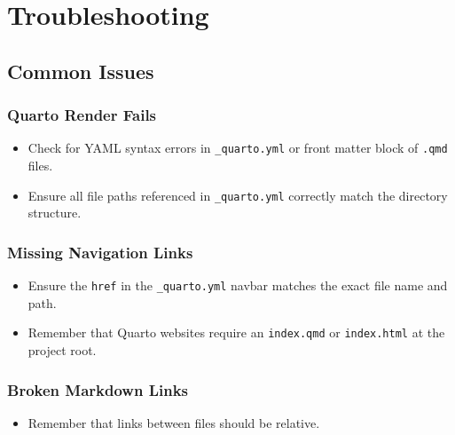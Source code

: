 \documentclass[
]{report}
\author{}
\date{}
\providecommand{\tightlist}{%
  \setlength{\itemsep}{0pt}\setlength{\parskip}{0pt}}
\renewcommand*\contentsname{Table of contents}
\newcommand\contentsname{Table of contents}
\begin{document}
\renewcommand*\contentsname{Table of contents}
{
\hypersetup{linkcolor=}
\setcounter{tocdepth}{2}
\tableofcontents
}

\chapter{Troubleshooting}\label{troubleshooting}

\section{Common Issues}\label{common-issues}

\subsection{Quarto Render Fails}\label{quarto-render-fails}

\begin{itemize}
\tightlist
\item
  Check for YAML syntax errors in \texttt{\_quarto.yml} or front matter
  block of \texttt{.qmd} files.
\item
  Ensure all file paths referenced in \texttt{\_quarto.yml} correctly
  match the directory structure.
\end{itemize}

\subsection{Missing Navigation Links}\label{missing-navigation-links}

\begin{itemize}
\tightlist
\item
  Ensure the \texttt{href} in the \texttt{\_quarto.yml} navbar matches
  the exact file name and path.
\item
  Remember that Quarto websites require an \texttt{index.qmd} or
  \texttt{index.html} at the project root.
\end{itemize}

\subsection{Broken Markdown Links}\label{broken-markdown-links}

\begin{itemize}
\tightlist
\item
  Remember that links between files should be relative.
\end{itemize}
\end{document}
